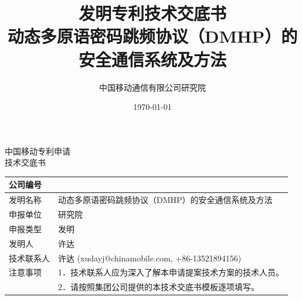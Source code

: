 ﻿\documentclass[12pt,a4paper]{article}
\title{\textbf{发明专利技术交底书}\\[0.5em]
    \Large 动态多原语密码跳频协议（DMHP）的安全通信系统及方法}
\author{中国移动通信有限公司研究院}
\date{\today}
\begin{document}
\maketitle

\begin{center}
    {\Large\heiti 中国移动专利申请} \\[1em]
    {\Huge\heiti 技术交底书} \\[1em]
\end{center}

\noindent
\begin{tabular}{|p{3cm}|p{12cm}|}
\hline
公司编号 &  \\
\hline
发明名称 & 动态多原语密码跳频协议（DMHP）的安全通信系统及方法 \\
\hline
申报单位 & 研究院 \\
\hline
申报类型 & 发明 \\
\hline
发明人 & 许达 \\
\hline
技术联系人 & 许达 (xudayj@chinamobile.com, +86-13521894156) \\
\hline
注意事项 & 1．技术联系人应为深入了解本申请提案技术方案的技术人员。 \\
         & 2．请按照集团公司提供的本技术交底书模板逐项填写。 \\
\hline
\end{tabular}

\vspace{0.5cm}
\end{document}
